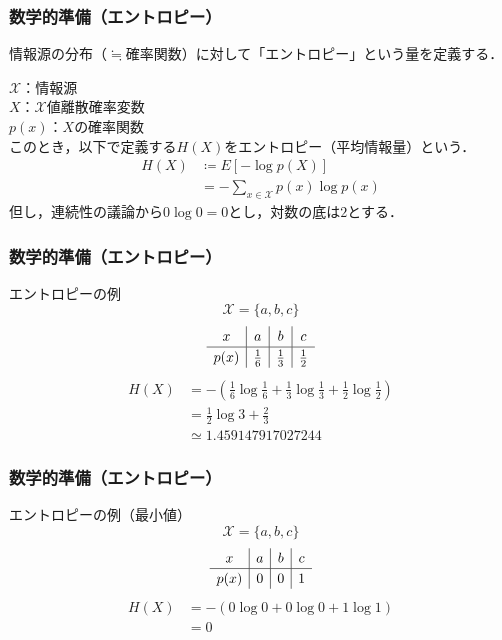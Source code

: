 \documentclass{classes/myslide}
\begin{document}
\begin{frame}\frametitle{数学的準備（エントロピー）}
  情報源の分布（$\fallingdotseq$確率関数）に対して「エントロピー」という量を定義する．
  \begin{definition}[エントロピー]
    $\mathcal{X}$：情報源 \\
    $X$：$\mathcal{X}$値離散確率変数 \\
    $p(x)$：$X$の確率関数 \\
    このとき，以下で定義する$H(X)$をエントロピー（平均情報量）という．
    \begin{align*}
      H(X) 
      &\coloneq E[-\log p(X)] \\ 
      &= -\sum_{x \in \mathcal{X}}p(x) \log p(x)
    \end{align*}
    但し，連続性の議論から$0 \log 0 = 0$とし，対数の底は$2$とする．
  \end{definition}
\end{frame}

\begin{frame}\frametitle{数学的準備（エントロピー）}
  \begin{exampleblock}{エントロピーの例}
    \[ \mathcal{X} = \{a, b, c\} \]
    \[
      \begingroup
      \renewcommand{\arraystretch}{1.2}
        \begin{array}{c|c|c|c}
          x & a & b & c \\ \hline
          p(x) & \frac{1}{6} & \frac{1}{3} & \frac{1}{2}
        \end{array}
      \endgroup
    \]
    \begin{align*}
      H(X)
      &= - \left( \frac{1}{6} \log \frac{1}{6} + \frac{1}{3} \log \frac{1}{3} + \frac{1}{2} \log \frac{1}{2}\right) \\
      &= \frac{1}{2}\log 3 + \frac{2}{3} \\
      &\simeq 1.459147917027244
    \end{align*}
  \end{exampleblock}
\end{frame}

\begin{frame}\frametitle{数学的準備（エントロピー）}
  \begin{exampleblock}{エントロピーの例（最小値）}
    \[ \mathcal{X} = \{a, b, c\} \]
    \[
      \begingroup
      \renewcommand{\arraystretch}{1.2}
        \begin{array}{c|c|c|c}
          x & a & b & c \\ \hline
          p(x) & 0 & 0 & 1
        \end{array}
      \endgroup
    \]
    \begin{align*}
      H(X)
      &= -(0 \log 0 + 0 \log 0 + 1 \log 1) \\
      &= 0
    \end{align*}
  \end{exampleblock}
\end{frame}
\end{document}
